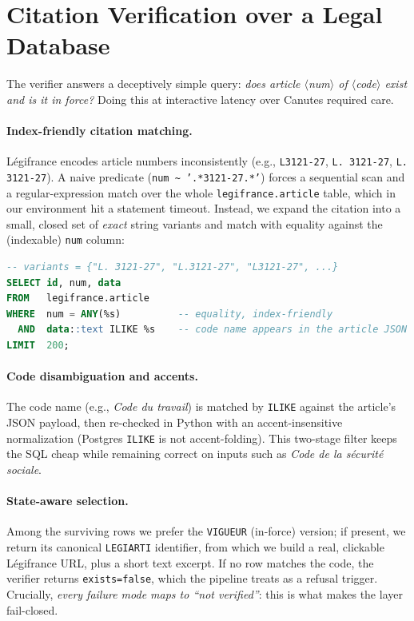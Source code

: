 \section{Citation Verification over a Legal Database}
\label{sec:verify}

The verifier answers a deceptively simple query: \emph{does article
$\langle$num$\rangle$ of $\langle$code$\rangle$ exist and is it in force?} Doing
this at interactive latency over Canutes required care.

\paragraph{Index-friendly citation matching.}
Légifrance encodes article numbers inconsistently (e.g., \texttt{L3121-27},
\texttt{L.\,3121-27}, \texttt{L. 3121-27}). A naive predicate
(\texttt{num \textasciitilde{} '.*3121-27.*'}) forces a sequential scan and a
regular-expression match over the whole \texttt{legifrance.article} table,
which in our environment hit a statement timeout. Instead, we expand the
citation into a small, closed set of \emph{exact} string variants and match
with equality against the (indexable) \texttt{num} column:

\begin{lstlisting}[style=lr, language=SQL]
-- variants = {"L. 3121-27", "L.3121-27", "L3121-27", ...}
SELECT id, num, data
FROM   legifrance.article
WHERE  num = ANY(%s)          -- equality, index-friendly
  AND  data::text ILIKE %s    -- code name appears in the article JSON
LIMIT  200;
\end{lstlisting}

\paragraph{Code disambiguation and accents.}
The code name (e.g., \emph{Code du travail}) is matched by \texttt{ILIKE}
against the article's JSON payload, then re-checked in Python with an
accent-insensitive normalization (Postgres \texttt{ILIKE} is not
accent-folding). This two-stage filter keeps the SQL cheap while remaining
correct on inputs such as \emph{Code de la s\'ecurit\'e sociale}.

\paragraph{State-aware selection.}
Among the surviving rows we prefer the \texttt{VIGUEUR} (in-force) version;
if present, we return its canonical \texttt{LEGIARTI} identifier, from which we
build a real, clickable Légifrance URL, plus a short text excerpt. If no row
matches the code, the verifier returns \texttt{exists=false}, which the
pipeline treats as a refusal trigger. Crucially, \emph{every failure mode maps
to ``not verified''}: this is what makes the layer fail-closed.

